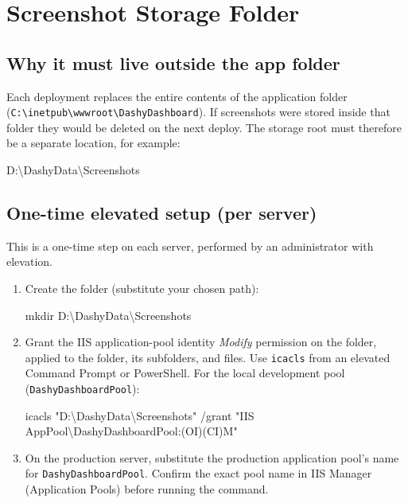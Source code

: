 \documentclass[12pt,a4paper]{report}
\begin{document}
\chapter{Screenshot Storage Folder}
\label{ch:storage}

\section{Why it must live outside the app folder}

Each deployment replaces the entire contents of the application folder
(\texttt{C:\textbackslash inetpub\textbackslash wwwroot\textbackslash DashyDashboard}). If
screenshots were stored inside that folder they would be deleted on the next deploy. The storage
root must therefore be a separate location, for example:

\begin{codebox}
\ttfamily D:\textbackslash DashyData\textbackslash Screenshots
\end{codebox}

\section{One-time elevated setup (per server)}

This is a one-time step on each server, performed by an administrator with elevation.

\begin{enumerate}
  \item Create the folder (substitute your chosen path):
  \begin{codebox}
  \ttfamily mkdir D:\textbackslash DashyData\textbackslash Screenshots
  \end{codebox}

  \item Grant the IIS application-pool identity \emph{Modify} permission on the folder, applied to
        the folder, its subfolders, and files. Use \texttt{icacls} from an elevated Command Prompt
        or PowerShell. For the local development pool (\texttt{DashyDashboardPool}):
  \begin{codebox}
  \ttfamily icacls "D:\textbackslash DashyData\textbackslash Screenshots" /grant "IIS AppPool\textbackslash DashyDashboardPool:(OI)(CI)M"
  \end{codebox}

  \item On the production server, substitute the production application pool's name for
        \texttt{DashyDashboardPool}. Confirm the exact pool name in IIS Manager
        (Application Pools) before running the command.
\end{enumerate}
\end{document}
